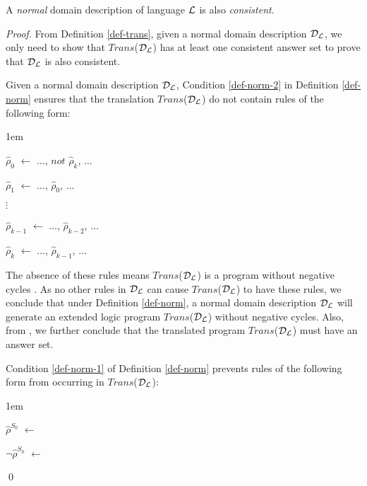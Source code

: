 \documentclass[global,twocolumn,final]{svjour}
\newenvironment{vtheorem}[1]
  {\begin{theorem}[#1]\hspace{0.25em}}
  {\end{theorem}}
\newenvironment{vproof}
  {\begin{proof}\hspace{0.25em}}
  {\qed\end{proof}}
\newenvironment{vquote}
  {\begin{list}{}{\leftmargin 1em}\item[]}
  {\end{list}}
\begin{document}
    \begin{vtheorem}{Domain Consistency}
      \label{the-cons}
      A {\em normal} domain description of language ${\cal L}$ is also
      {\em consistent}.
    \end{vtheorem}

    \begin{vproof}
      From Definition \ref{def-trans}, given a normal domain description
      ${\cal D}_{\cal L}$, we only need to show that
      $Trans$(${\cal D}_{\cal L}$) has at least one consistent answer set to
      prove that ${\cal D}_{\cal L}$ is also consistent.

      Given a normal domain description ${\cal D}_{\cal L}$, Condition
      \ref{def-norm-2} in Definition \ref{def-norm} ensures that the
      translation $Trans$(${\cal D}_{\cal L}$) do not contain rules of the
      following form:

      \begin{vquote}
        $\hat{\rho}_{0}$ $\leftarrow$ $\hdots$, $not$ $\hat{\rho}_{k}$, $\hdots$

        $\hat{\rho}_{1}$ $\leftarrow$ $\hdots$, $\hat{\rho}_{0}$, $\hdots$

        $\vdots$

        $\hat{\rho}_{k - 1}$ $\leftarrow$ $\hdots$, $\hat{\rho}_{k - 2}$, $\hdots$

        $\hat{\rho}_{k}$ $\leftarrow$ $\hdots$, $\hat{\rho}_{k - 1}$, $\hdots$
      \end{vquote}

      The absence of these rules means $Trans$(${\cal D}_{\cal L}$) is a
      program without negative cycles \cite{LIN}. As no other rules in
      ${\cal D}_{\cal L}$ can cause $Trans$(${\cal D}_{\cal L}$) to have these
      rules, we conclude that under Definition \ref{def-norm}, a normal domain
      description ${\cal D}_{\cal L}$ will generate an extended logic program
      $Trans$(${\cal D}_{\cal L}$) without negative cycles. Also, from
      \cite{BAR,LIN}, we further conclude that the translated program
      $Trans$(${\cal D}_{\cal L}$) must have an answer set.

      Condition \ref{def-norm-1} of Definition \ref{def-norm} prevents rules
      of the following form from occurring in $Trans$(${\cal D}_{\cal L}$):

      \begin{vquote}
        $\hat{\rho}^{S_{0}}$ $\leftarrow$

        $\lnot\hat{\rho}^{S_{0}}$ $\leftarrow$
      \end{vquote}


\end{vproof}
\end{document}
